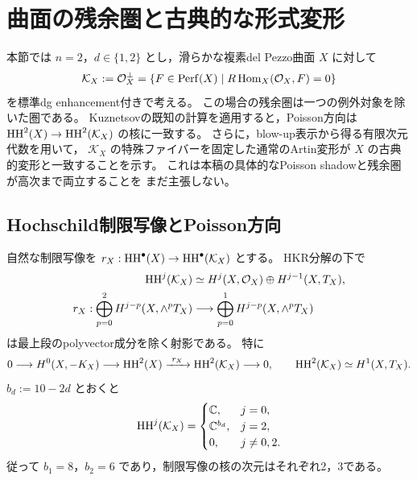 \section{曲面の残余圏と古典的な形式変形}
\label{sec:kuznetsov-surface}

本節では $n=2$，$d\in\{1,2\}$ とし，滑らかな複素del Pezzo曲面 $X$ に対して
\[
 \mathcal K_X:=\mathcal O_X^\perp
 =\{F\in\operatorname{Perf}(X)\mid R\operatorname{Hom}_X(\mathcal O_X,F)=0\}
\]
を標準dg enhancement付きで考える。
この場合の残余圏は一つの例外対象を除いた圏である。
Kuznetsovの既知の計算を適用すると，Poisson方向は
$\operatorname{HH}^2(X)\to\operatorname{HH}^2(\mathcal K_X)$ の核に一致する。
さらに，blow-up表示から得る有限次元代数を用いて，
$\mathcal K_X$ の特殊ファイバーを固定した通常のArtin変形が
$X$ の古典的変形と一致することを示す。
これは本稿の具体的なPoisson shadowと残余圏が高次まで両立することを
まだ主張しない。

\subsection{Hochschild制限写像とPoisson方向}

\begin{theorem}[Kuznetsovの計算の曲面への適用]
\label{thm:surface-ku-hochschild}
自然な制限写像を $r_X:\operatorname{HH}^\bullet(X)\to\operatorname{HH}^\bullet(\mathcal K_X)$ とする。
HKR分解の下で
\begin{equation}\label{eq:surface-ku-hh-projection}
 \begin{aligned}
  \operatorname{HH}^j(\mathcal K_X)
   &\simeq H^j(X,\mathcal O_X)\oplus H^{j-1}(X,T_X),\\
  r_X:\bigoplus_{p=0}^{2}H^{j-p}(X,\wedge^pT_X)
   &\longrightarrow\bigoplus_{p=0}^{1}H^{j-p}(X,\wedge^pT_X)
 \end{aligned}
\end{equation}
は最上段のpolyvector成分を除く射影である。
特に
\begin{equation}\label{eq:surface-ku-hh2-exact}
 0\longrightarrow H^0(X,-K_X)
 \longrightarrow\operatorname{HH}^2(X)
 \xrightarrow{\ r_X\ }\operatorname{HH}^2(\mathcal K_X)
 \longrightarrow0,
 \qquad \operatorname{HH}^2(\mathcal K_X)\simeq H^1(X,T_X).
\end{equation}
$b_d:=10-2d$ とおくと
\begin{equation}\label{eq:surface-ku-hh-dimensions}
 \operatorname{HH}^j(\mathcal K_X)=
 \begin{cases}
 \mathbb C,&j=0,\\
 \mathbb C^{b_d},&j=2,\\
 0,&j\ne0,2.
 \end{cases}
\end{equation}
従って $b_1=8$，$b_2=6$ であり，制限写像の核の次元はそれぞれ2，3である。
\end{theorem}

